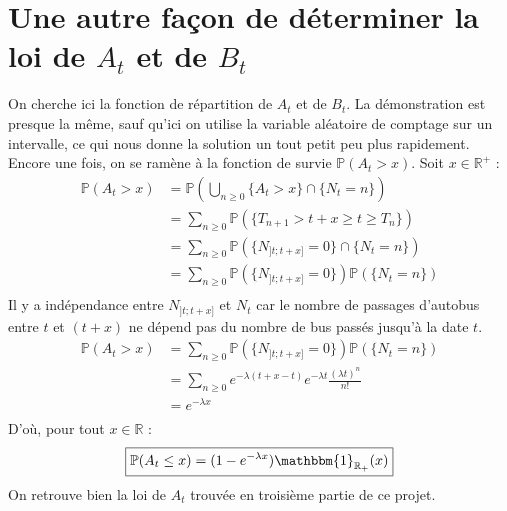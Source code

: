 \documentclass[a4paper, titlepage]{livret} %
\begin{document}
	\chapter{Une autre façon de déterminer la loi de $A_{t}$ et de $B_{t}$}
		On cherche ici la fonction de répartition de $A_{t}$ et de $B_{t}$.
		La démonstration est presque la même, sauf qu'ici on utilise la variable aléatoire de comptage sur un intervalle, ce qui nous donne la solution un tout petit peu plus rapidement.
		Encore une fois, on se ramène à la fonction de survie $\mathbb{P}(A_{t} > x)$.
		Soit $x \in \mathbb{R}^{+}$ :
		\[\begin{aligned}
			\mathbb{P}(A_{t} > x) & = \mathbb{P}\left(\bigcup_{n \geq 0} \{A_{t} > x\} \cap \{N_{t} = n\}\right)\\
								  & = \sum_{n \geq 0} \mathbb{P}(\{T_{n+1} > t + x \geq t \geq T_{n}\})\\
								  & = \sum_{n \geq 0} \mathbb{P}(\{N_{]t;t+x]} = 0\} \cap \{N_{t} = n\})\\
								  & = \sum_{n \geq 0} \mathbb{P}(\{N_{]t;t+x]} = 0\}) \mathbb{P}(\{N_{t} = n\})\\
		\end{aligned}\]
		Il y a indépendance entre $N_{]t;t+x]}$ et $N_{t}$ car le nombre de passages d'autobus entre $t$ et $(t+x)$ ne dépend pas du nombre de bus passés jusqu'à la date $t$.
		\[\begin{aligned}
			\mathbb{P}(A_{t} > x) & = \sum_{n \geq 0} \mathbb{P}(\{N_{]t;t+x]} = 0\}) \mathbb{P}(\{N_{t} = n\})\\
							      & = \sum_{n \geq 0} e^{-\lambda (t+x - t)} e^{-\lambda t} \frac{(\lambda t)^{n}}{n!}\\
							      & = e^{-\lambda x}\\
		\end{aligned}\]
		D'où, pour tout $x \in \mathbb{R}$ :
		\[\boxed{
			\mathbb{P}(A_{t} \leq x) = (1 - e^{-\lambda x})\mathbbm{1}_{\mathbb{R}_{+}}(x)
		}\]
		On retrouve bien la loi de $A_{t}$ trouvée en troisième partie de ce projet.
\end{document}
